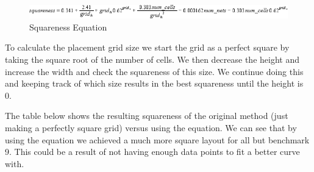 \documentclass[10pt]{article}
\begin{document}
        \begin{figure}[H]
            \centering
            \includegraphics[width=\linewidth]{./square_eq.png}
            \caption{Squareness Equation}
        \end{figure}

        To calculate the placement grid size we start the grid as a perfect
        square by taking the square root of the number of cells. We then
        decrease the height and increase the width and check the squareness of
        this size. We continue doing this and keeping track of which size
        results in the best squareness until the height is 0.

        The table below shows the resulting squareness of the original method
        (just making a perfectly square grid) versus using the equation. We
        can see that by using the equation we achieved a much more square
        layout for all but benchmark 9. This could be a result of not having
        enough data points to fit a better curve with.
\end{document}
